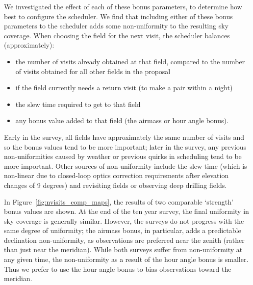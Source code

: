 \documentclass[DM,lsstdraft,authoryear,toc]{lsstdoc}
\begin{document}
We investigated the effect of each of these bonus parameters, to determine how best to configure the scheduler. We find that including either of these bonus parameters to the scheduler adds some non-uniformity to the resulting sky coverage. When choosing the field for the next visit, the scheduler balances (approximately):
\begin{itemize}
\item the number of visits already obtained at that field, compared to the number of visits obtained for all other fields in the proposal
\item if the field currently needs a return visit (to make a pair within a night)
\item the slew time required to get to that field
\item any bonus value added to that field (the airmass or hour angle bonus).
\end{itemize}
Early in the survey, all fields have approximately the same number of visits and so the bonus values tend to be more important; later in the survey, any previous non-uniformities caused by weather or previous quirks in scheduling tend to be more important. Other sources of non-uniformity include the slew time (which is non-linear due to closed-loop optics correction requirements after elevation changes of 9 degrees) and revisiting fields or observing deep drilling fields.

In Figure~\ref{fig:nvisits_comp_maps}, the results of two comparable `strength' bonus values are shown. At the end of the ten year survey, the final uniformity in sky coverage is generally similar. However, the surveys do not progress with the same degree of uniformity; the airmass bonus, in particular, adds a predictable declination non-uniformity, as observations are preferred near the zenith (rather than just near the meridian). While both surveys suffer from non-uniformity at any given time, the non-uniformity as a result of the hour angle bonus is smaller. Thus we prefer to use the hour angle bonus to bias observations toward the meridian.
\end{document}
